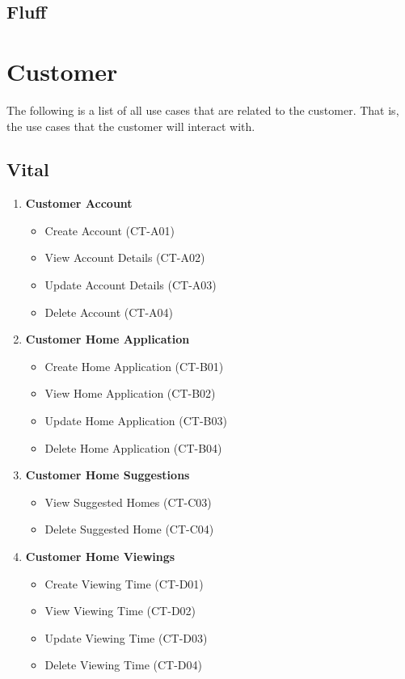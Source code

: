 \documentclass[11pt]{article}
\begin{document}
		\subsection{Fluff}
		
	
	\section{Customer}
	\begin{flushleft}
		The following is a list of all use cases that are related to the customer. That is, the use cases that the customer will interact with.
	\end{flushleft}

		\subsection{Vital}
			\begin{enumerate}[i]
				\item \textbf{Customer Account}
				\begin{itemize}
					\item Create Account (CT-A01)
					\item View Account Details (CT-A02)
					\item Update Account Details (CT-A03)
					\item Delete Account (CT-A04)
				\end{itemize}
				
				\item \textbf{Customer Home Application}
				\begin{itemize}
					\item Create Home Application (CT-B01)
					\item View Home Application (CT-B02)
					\item Update Home Application (CT-B03)
					\item Delete Home Application (CT-B04)
				\end{itemize}
				
				\item \textbf{Customer Home Suggestions}
				\begin{itemize}
					\item View Suggested Homes (CT-C03)
					\item Delete Suggested Home (CT-C04)
				\end{itemize}
				
				\item \textbf{Customer Home Viewings}
				\begin{itemize}
					\item Create Viewing Time (CT-D01)
					\item View Viewing Time (CT-D02)
					\item Update Viewing Time (CT-D03)
					\item Delete Viewing Time (CT-D04)
				\end{itemize}
			\end{enumerate}
\end{document}
